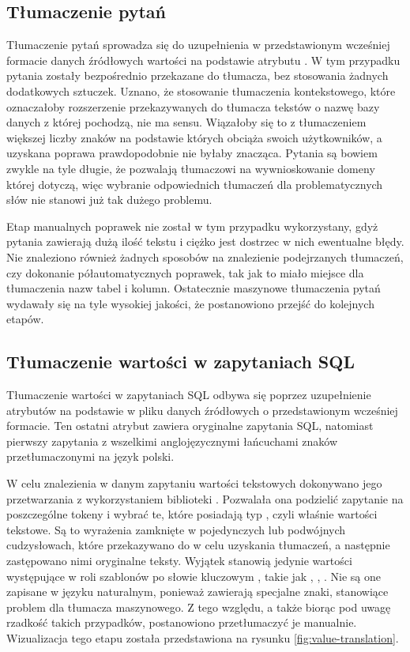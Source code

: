 \subsection{Tłumaczenie pytań}
Tłumaczenie pytań sprowadza się do uzupełnienia w przedstawionym wcześniej formacie danych źródłowych wartości  na podstawie atrybutu . W tym przypadku pytania zostały bezpośrednio przekazane do tłumacza, bez stosowania żadnych dodatkowych sztuczek. Uznano, że stosowanie tłumaczenia kontekstowego, które oznaczałoby rozszerzenie przekazywanych do tłumacza tekstów o nazwę bazy danych z której pochodzą, nie ma sensu. Wiązałoby się to z tłumaczeniem większej liczby znaków na podstawie których  obciąża swoich użytkowników, a uzyskana poprawa prawdopodobnie nie byłaby znacząca. Pytania są bowiem zwykle na tyle długie, że pozwalają tłumaczowi na wywnioskowanie domeny której dotyczą, więc wybranie odpowiednich tłumaczeń dla problematycznych słów nie stanowi już tak dużego problemu.

Etap manualnych poprawek nie został w tym przypadku wykorzystany, gdyż pytania zawierają dużą ilość tekstu i ciężko jest dostrzec w nich ewentualne błędy. Nie znaleziono również żadnych sposobów na znalezienie podejrzanych tłumaczeń, czy dokonanie półautomatycznych poprawek, tak jak to miało miejsce dla tłumaczenia nazw tabel i kolumn. Ostatecznie maszynowe tłumaczenia pytań wydawały się na tyle wysokiej jakości, że postanowiono przejść do kolejnych etapów.

\subsection{Tłumaczenie wartości w zapytaniach SQL}
Tłumaczenie wartości w zapytaniach SQL odbywa się poprzez uzupełnienie atrybutów  na podstawie  w pliku danych źródłowych o przedstawionym wcześniej formacie. Ten ostatni atrybut zawiera oryginalne zapytania SQL, natomiast pierwszy zapytania z wszelkimi anglojęzycznymi łańcuchami znaków przetłumaczonymi na język polski.

W celu znalezienia w danym zapytaniu wartości tekstowych dokonywano jego przetwarzania z wykorzystaniem biblioteki . Pozwalała ona podzielić zapytanie na poszczególne tokeny i wybrać te, które posiadają typ , czyli właśnie wartości tekstowe. Są to wyrażenia zamknięte w pojedynczych lub podwójnych cudzysłowach, które przekazywano do  w celu uzyskania tłumaczeń, a następnie zastępowano nimi oryginalne teksty. Wyjątek stanowią jedynie wartości występujące w roli szablonów po słowie kluczowym , takie jak , , . Nie są one zapisane w języku naturalnym, ponieważ zawierają specjalne znaki, stanowiące problem dla tłumacza maszynowego. Z tego względu, a także biorąc pod uwagę rzadkość takich przypadków, postanowiono przetłumaczyć je manualnie. Wizualizacja tego etapu została przedstawiona na rysunku \ref{fig:value-translation}.


